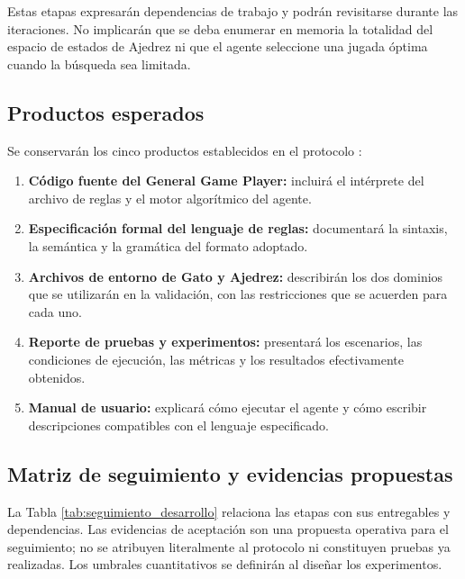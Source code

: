 Estas etapas expresarán dependencias de trabajo y podrán revisitarse durante las iteraciones. No implicarán que se deba enumerar en memoria la totalidad del espacio de estados de Ajedrez ni que el agente seleccione una jugada óptima cuando la búsqueda sea limitada.

\subsection{Productos esperados}

Se conservarán los cinco productos establecidos en el protocolo \cite{ProtocoloTT2027A178}:

\begin{enumerate}
    \item \textbf{Código fuente del General Game Player:} incluirá el intérprete del archivo de reglas y el motor algorítmico del agente.
    \item \textbf{Especificación formal del lenguaje de reglas:} documentará la sintaxis, la semántica y la gramática del formato adoptado.
    \item \textbf{Archivos de entorno de Gato y Ajedrez:} describirán los dos dominios que se utilizarán en la validación, con las restricciones que se acuerden para cada uno.
    \item \textbf{Reporte de pruebas y experimentos:} presentará los escenarios, las condiciones de ejecución, las métricas y los resultados efectivamente obtenidos.
    \item \textbf{Manual de usuario:} explicará cómo ejecutar el agente y cómo escribir descripciones compatibles con el lenguaje especificado.
\end{enumerate}

\subsection{Matriz de seguimiento y evidencias propuestas}

La Tabla \ref{tab:seguimiento_desarrollo} relaciona las etapas con sus entregables y dependencias. Las evidencias de aceptación son una propuesta operativa para el seguimiento; no se atribuyen literalmente al protocolo ni constituyen pruebas ya realizadas. Los umbrales cuantitativos se definirán al diseñar los experimentos.

